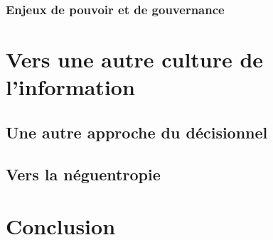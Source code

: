 \documentclass[a4paper,12pt]{report}
\begin{document}
\subsection{Enjeux de pouvoir et de gouvernance}

\chapter{Vers une autre culture de l'information}

\section{Une autre approche du décisionnel}

\section{Vers la néguentropie}

\chapter*{Conclusion}




\printindex
\end{document}
